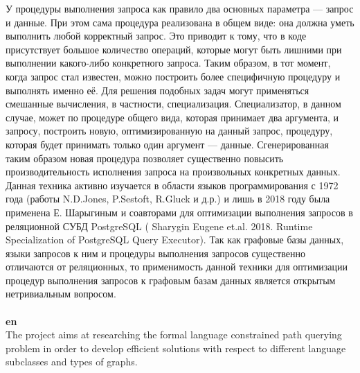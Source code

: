 \documentclass[12pt]{article}  %
\theoremstyle{remark}
\begin{document}
У процедуры выполнения запроса как правило два основных параметра — запрос и данные. При этом сама процедура реализована в общем виде: она должна уметь выполнить любой корректный запрос. Это приводит к тому, что в коде присутствует большое количество операций, которые могут быть лишними при выполнении какого-либо конкретного запроса. Таким образом, в тот момент, когда запрос стал известен, можно построить более специфичную процедуру и выполнять именно её. Для решения подобных задач могут применяться смешанные вычисления, в частности, специализация. Специализатор, в данном случае, может по процедуре общего вида, которая принимает два аргумента, и запросу, построить новую, оптимизированную на данный запрос, процедуру, которая будет принимать только один аргумент — данные. Сгенерированная таким образом новая процедура позволяет существенно повысить производительность исполнения запроса на произвольных конкретных данных. Данная техника активно изучается в области языков программирования с 1972 года (работы N.D.Jones, P.Sestoft, R.Gluck и д.р.) и лишь в 2018 году была применена Е. Шарыгиным и соавторами для оптимизации выполнения запросов в реляционной СУБД PostgreSQL ( Sharygin Eugene et.al. 2018. Runtime Specialization of PostgreSQL Query Executor). Так как графовые базы данных, языки запросов к ним и процедуры выполнения запросов существенно отличаются от реляционных, то применимость данной техники для оптимизации процедур выполнения запросов к графовым базам данных является открытым нетривиальным вопросом.
\\
\\
\textbf{en}\\


The project aims at researching the formal language constrained path querying problem in order to develop efficient solutions with respect to different language subclasses and types of graphs.
\end{document}
